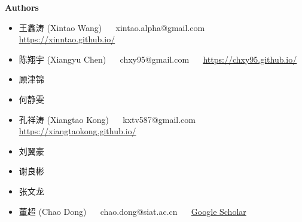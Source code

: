 \documentclass[../main.tex]{subfiles}
\begin{document}
\newpage

{\Large\textbf{Authors}}

\begin{itemize}
    \item 王鑫涛 (Xintao Wang) ~~ xintao.alpha@gmail.com ~~ \url{https://xinntao.github.io/}
    \item 陈翔宇 (Xiangyu Chen) ~~ chxy95@gmail.com ~~ \url{https://chxy95.github.io/}
    \item 顾津锦
    \item 何静雯
    \item 孔祥涛 (Xiangtao Kong) ~~ kxtv587@gmail.com ~~ \url{https://xiangtaokong.github.io/}
    \item 刘翼豪
    \item 谢良彬
    \item 张文龙
    \item 董超 (Chao Dong) ~~ chao.dong@siat.ac.cn ~~ \href{https://scholar.google.com.hk/citations?user=OSDCB0UAAAAJ}{Google Scholar}
\end{itemize}
\end{document}
